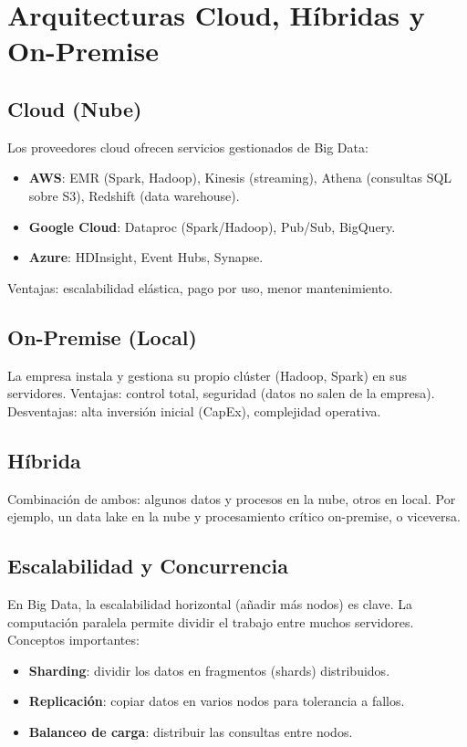 \documentclass[12pt,a4paper,openany,oneside]{book}
\begin{document}
\chapter{Arquitecturas Cloud, Híbridas y On-Premise}
\section{Cloud (Nube)}
Los proveedores cloud ofrecen servicios gestionados de Big Data:
\begin{itemize}
    \item \textbf{AWS}: EMR (Spark, Hadoop), Kinesis (streaming), Athena (consultas SQL sobre S3), Redshift (data warehouse).
    \item \textbf{Google Cloud}: Dataproc (Spark/Hadoop), Pub/Sub, BigQuery.
    \item \textbf{Azure}: HDInsight, Event Hubs, Synapse.
\end{itemize}
Ventajas: escalabilidad elástica, pago por uso, menor mantenimiento.

\section{On-Premise (Local)}
La empresa instala y gestiona su propio clúster (Hadoop, Spark) en sus servidores. Ventajas: control total, seguridad (datos no salen de la empresa). Desventajas: alta inversión inicial (CapEx), complejidad operativa.

\section{Híbrida}
Combinación de ambos: algunos datos y procesos en la nube, otros en local. Por ejemplo, un data lake en la nube y procesamiento crítico on-premise, o viceversa.

\section{Escalabilidad y Concurrencia}
En Big Data, la escalabilidad horizontal (añadir más nodos) es clave. La computación paralela permite dividir el trabajo entre muchos servidores. Conceptos importantes:
\begin{itemize}
    \item \textbf{Sharding}: dividir los datos en fragmentos (shards) distribuidos.
    \item \textbf{Replicación}: copiar datos en varios nodos para tolerancia a fallos.
    \item \textbf{Balanceo de carga}: distribuir las consultas entre nodos.
\end{itemize}
\end{document}
